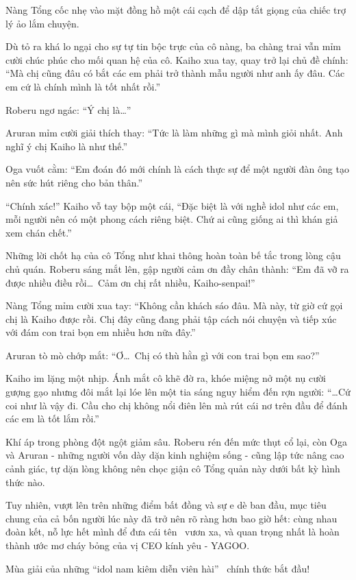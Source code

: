 \documentclass[../main.tex]{subfiles}
\begin{document}
Nàng Tổng cốc nhẹ vào mặt đồng hồ một cái cạch để dập tắt giọng của chiếc trợ lý ảo lắm chuyện.

Dù tỏ ra khá lo ngại cho sự tự tin bộc trực của cô nàng, ba chàng trai vẫn mỉm cười chúc phúc cho mối quan hệ của cô. Kaiho xua tay, quay trở lại chủ đề chính: ``Mà chị cũng đâu có bắt các em phải trở thành mẫu người như anh ấy đâu. Các em cứ là chính mình là tốt nhất rồi.''

Roberu ngơ ngác: ``Ý chị là\dots''

Aruran mỉm cười giải thích thay: ``Tức là làm những gì mà mình giỏi nhất. Anh nghĩ ý chị Kaiho là như thế.''

Oga vuốt cằm: ``Em đoán đó mới chính là cách thực sự để một người đàn ông tạo nên sức hút riêng cho bản thân.''

``Chính xác!'' Kaiho vỗ tay bộp một cái, ``Đặc biệt là với nghề idol như các em, mỗi người nên có một phong cách riêng biệt. Chứ ai cũng giống ai thì khán giả xem chán chết.''

Những lời chốt hạ của cô Tổng như khai thông hoàn toàn bế tắc trong lòng cậu chủ quán. Roberu sáng mắt lên, gập người cảm ơn đầy chân thành: ``Em đã vỡ ra được nhiều điều rồi\dots\ Cảm ơn chị rất nhiều, Kaiho-senpai!''

Nàng Tổng mỉm cười xua tay: ``Không cần khách sáo đâu. Mà này, từ giờ cứ gọi chị là Kaiho được rồi. Chị đây cũng đang phải tập cách nói chuyện và tiếp xúc với đám con trai bọn em nhiều hơn nữa đây.''

Aruran tò mò chớp mắt: ``Ơ\dots\ Chị có thù hằn gì với con trai bọn em sao?''

Kaiho im lặng một nhịp. Ánh mắt cô khẽ đờ ra, khóe miệng nở một nụ cười gượng gạo nhưng đôi mắt lại lóe lên một tia sáng nguy hiểm đến rợn người: ``\dots Cứ coi như là vậy đi. Cầu cho chị không nổi điên lên mà rút cái nơ trên đầu để đánh các em là tốt lắm rồi.''

Khí áp trong phòng đột ngột giảm sâu. Roberu rén đến mức thụt cổ lại, còn Oga và Aruran - những người vốn dày dặn kinh nghiệm sống - cũng lập tức nâng cao cảnh giác, tự dặn lòng không nên chọc giận cô Tổng quản này dưới bất kỳ hình thức nào.

Tuy nhiên, vượt lên trên những điểm bất đồng và sự e dè ban đầu, mục tiêu chung của cả bốn người lúc này đã trở nên rõ ràng hơn bao giờ hết: cùng nhau đoàn kết, nỗ lực hết mình để đưa cái tên \hls\ vươn xa, và quan trọng nhất là hoàn thành ước mơ cháy bỏng của vị CEO kính yêu - YAGOO.

Mùa giải của những ``idol nam kiêm diễn viên hài'' \hls\ chính thức bắt đầu!
\end{document}
